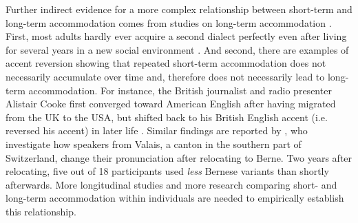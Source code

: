 \documentclass[output=paper,
modfonts
]{langscibook}
\begin{document}
Further indirect evidence for a more complex relationship between short-term and long-term accommodation comes from studies on long-term accommodation \citep[see][]{ruch_function_2018}. First, most adults hardly ever acquire a second dialect perfectly even after living for several years in a new social environment \citep{siegel_second_2010}. And second, there are examples of accent reversion showing that repeated short-term accommodation does not necessarily accumulate over time and, therefore does not necessarily lead to long-term accommodation. For instance, the British journalist and radio presenter Alistair Cooke  first converged toward American English after having migrated from the UK to the USA, but shifted back to his British English accent (i.e. reversed his accent) in later life \citep{reubold_dissociating_2015}.  Similar findings are reported by \cite{werlen_zwischen_2006}, who investigate how speakers from Valais, a canton in the southern part of Switzerland, change their pronunciation after relocating to Berne. Two years after relocating, five out of 18 participants used \textit{less} Bernese variants than shortly afterwards. More longitudinal studies and more research comparing short- and long-term accommodation within individuals are needed to empirically establish this relationship.
% 
% 
% 
% 
% 
% 
% 
% 
% 
\end{document}
